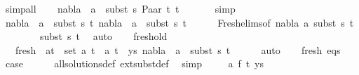 \begin{isabellebody}
\ simp{\isacharunderscore}{\kern0pt}all\isanewline
\ \ \isamarkupfalse%
\ {\isachardoublequoteopen}nabla{}\ {\isasymturnstile}\ a\ {\isasymsharp}\ subst\ s{}\ {\isacharparenleft}{\kern0pt}Paar\ t{}\ t{}{\isacharparenright}{\kern0pt}{\isachardoublequoteclose}\ \isanewline
\ \ \ \ \isamarkupfalse%
\ simp\isanewline
\ \ \isamarkupfalse%
\ {\isachardoublequoteopen}nabla{}\ {\isasymturnstile}\ a\ {\isasymsharp}\ subst\ s{}\ t{}{\isachardoublequoteclose}\ {\isachardoublequoteopen}nabla{}\ {\isasymturnstile}\ a\ {\isasymsharp}\ subst\ s{}\ t{}{\isachardoublequoteclose}\isanewline
\ \ \ \ \isamarkupfalse%
\ Fresh{\isacharunderscore}{\kern0pt}elims{\isacharparenleft}{\kern0pt}{}{\isacharparenright}{\kern0pt}{\isacharbrackleft}{\kern0pt}of\ nabla{}\ a\ {\isacartoucheopen}subst\ s{}\ t{}{\isacartoucheclose}\isanewline
\ \ \ \ \ \ \ \ {\isacartoucheopen}subst\ s{}\ t{}{\isacartoucheclose}{\isacharbrackright}{\kern0pt}\ \isamarkupfalse%
\ auto\isanewline
\ \ \isamarkupfalse%
\ fresh{\isacharunderscore}{\kern0pt}old\ \isamarkupfalse%
\isanewline
\ \ \ fresh{\isacharcolon}{\kern0pt}\ {\isachardoublequoteopen}{\isasymforall}\ {\isacharparenleft}{\kern0pt}a{\isacharcomma}{\kern0pt}t{\isacharparenright}{\kern0pt}\ {\isasymin}\ set\ {\isacharparenleft}{\kern0pt}{\isacharparenleft}{\kern0pt}a{\isacharcomma}{\kern0pt}\ t{}{\isacharparenright}{\kern0pt}\ {\isacharhash}{\kern0pt}\ {\isacharparenleft}{\kern0pt}a{\isacharcomma}{\kern0pt}\ t{}{\isacharparenright}{\kern0pt}\ {\isacharhash}{\kern0pt}\ ys{\isacharparenright}{\kern0pt}{\isachardot}{\kern0pt}\ nabla{}\ {\isasymturnstile}\ a\ {\isasymsharp}\ subst\ s{}\ t{\isachardoublequoteclose}\isanewline
\ \ \ \ \isamarkupfalse%
\ auto\isanewline
\ \ \isamarkupfalse%
\ fresh\ eqs\isanewline
\ \ \isamarkupfalse%
\ {\isacharquery}{\kern0pt}case\isanewline
\ \ \ \ \isamarkupfalse%
\ all{\isacharunderscore}{\kern0pt}solutions{\isacharunderscore}{\kern0pt}def\ ext{\isacharunderscore}{\kern0pt}subst{\isacharunderscore}{\kern0pt}def\ \isamarkupfalse%
\ simp\isanewline
{}\isamarkupfalse%
\isanewline
\ \ \isamarkupfalse%
\ {\isacharparenleft}{\kern0pt}{}\ a\ f\ t\ ys{\isacharparenright}{\kern0pt}\isanewline

\end{isabellebody}
